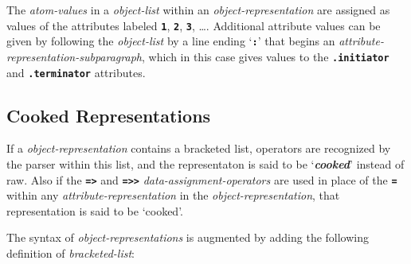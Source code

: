 \documentclass[12pt]{article}
\newcommand{\TT}[1]{{\tt \bfseries #1}}
\newcommand{\key}[1]{{\bf \em #1}\index{#1}}
\begin{document}
The {\em atom-values} in a {\em object-list}
within an {\em object-representation}
are assigned as values of the attributes labeled \TT{1}, \TT{2},
\TT{3}, \ldots.  Additional attribute values can be given by
following the {\em object-list} by a line ending `\TT{:}' that begins an
{\em attribute-representation-subparagraph}, which in this case
gives values to the \TT{.initiator} and \TT{.terminator} attributes.

\subsection{Cooked Representations}

If a {\em object-representation} contains a bracketed list, operators
are recognized by the parser within this list, and the representaton
is said to be `\key{cooked}' instead of raw.  Also if
the \TT{=>} and \TT{=>{}>} {\em data-assignment-operators}
are used in place of the \TT{=} within any {\em attribute-representation}
in the {\em object-representation}, that representation is
said to be `cooked'.

The syntax of {\em object-representations} is augmented by adding
the following definition of {\em bracketed-list}:
\end{document}
